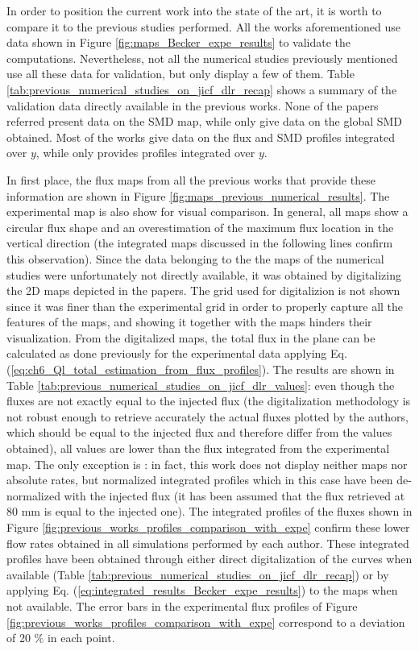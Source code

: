 In order to position the current work into the state of the art, it is worth to compare it to the previous studies performed. All the works aforementioned use data shown in Figure \ref{fig:maps_Becker_expe_results} to validate the computations. Nevertheless, not all the numerical studies previously mentioned use all these data for validation, but only display a few of them. Table \ref{tab:previous_numerical_studies_on_jicf_dlr_recap} shows a summary of the validation data directly available in the previous works. None of the papers referred present data on the SMD map, while only  give data on the global SMD obtained. Most of the works give data on the flux and SMD profiles integrated over $y$, while only  provides profiles integrated over $y$. %

In first place, the flux maps from all the previous works that provide these information are shown in Figure \ref{fig:maps_previous_numerical_results}. The experimental map is also show for visual comparison. In general, all maps show a circular flux shape and an overestimation of the maximum flux location in the vertical direction (the integrated maps discussed in the following lines confirm this observation). Since the data belonging to the the maps of the numerical studies were unfortunately not directly available, it was obtained by digitalizing the 2D maps depicted in the papers. The grid used for digitalizion is not shown since it was finer than the experimental grid in order to properly capture all the features of the maps, and showing it together with the maps hinders their visualization. From the digitalized maps, the total flux in the plane can be calculated as done previously for the experimental data applying Eq. (\ref{eq:ch6_Ql_total_estimation_from_flux_profiles}). The results are shown in Table \ref{tab:previous_numerical_studies_on_jicf_dlr_values}: even though the fluxes are not exactly equal to the injected flux (the digitalization methodology is not robust enough to retrieve accurately the actual fluxes plotted by the authors, which should be equal to the injected flux and therefore differ from the values obtained), all values are lower than the flux integrated from the experimental map. The only exception is : in fact, this work does not display neither maps nor absolute rates, but normalized integrated profiles which in this case have been de-normalized with the injected flux (it has been assumed that the flux retrieved at 80 mm is equal to the injected one). The integrated profiles of the fluxes shown in Figure \ref{fig:previous_works_profiles_comparison_with_expe} confirm these lower flow rates obtained in all simulations performed by each author. These integrated profiles have been obtained through either direct digitalization of the curves when available (Table \ref{tab:previous_numerical_studies_on_jicf_dlr_recap}) or by applying Eq. (\ref{eq:integrated_results_Becker_expe_results}) to the maps when not available. The error bars in the experimental flux profiles of Figure \ref{fig:previous_works_profiles_comparison_with_expe} correspond to a deviation of 20 $\%$ in each point. 


